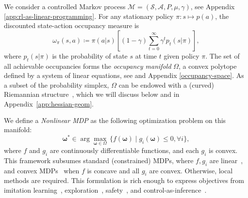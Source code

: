 \documentclass{article}
\theoremstyle{plain}
\theoremstyle{definition}
\theoremstyle{remark}
\newcommand{\sS}{\mathcal{S}}
\newcommand{\sA}{\mathcal{A}}
\begin{document}
We consider a controlled Markov process $\mathcal{M}=(\sS,\sA,P,\mu,\gamma)$, see Appendix \ref{app:rl-as-linear-programming}. 
For any stationary policy $\pi: s \mapsto p(a)$, the discounted state-action occupancy measure is
\begin{equation}
\omega_\pi(s,a) \coloneqq \pi(a|s)\left[(1-\gamma)\sum_{t=0}^\infty \gamma^t p_{t}(s|\pi)\right],
\end{equation}
where $p_{t}(s|\pi)$ is the probability of state $s$ at time $t$ given policy $\pi$. 
The set of all achievable occupancies forms the \emph{occupancy manifold} $\Omega$, a convex polytope defined by a system of linear equations, see \citep{kallenberg1994survey} and Appendix \ref{occupancy-space}. 
As a subset of the probability simplex, $\Omega$ can be endowed with a (curved) Riemannian structure~\citep{amari1982differential,ay2017information}, which we will discuss below and in Appendix~\ref{app:hessian-geom}.

We define a \emph{Nonlinear MDP} as the following optimization problem on this manifold:
\begin{equation}\label{eq:n-mdp}\tag{N-MDP}
\boldsymbol{\omega^*} \in \arg \max_{\boldsymbol{\omega} \in \Omega}\, \{f(\boldsymbol{\omega}) \mid g_i(\boldsymbol{\omega}) \leq 0, \forall i \},
\end{equation}
where $f$ and $g_i$ are continuously differentiable functions, and each $g_i$ is convex. This framework subsumes standard (constrained) MDPs, where $f, g_i$ are linear~\citep{Altman1999ConstrainedMD}, and convex MDPs~\citep{zahavy2021reward} when $f$ is concave and all $g_i$ are convex. 
Otherwise, local methods are required. This formulation is rich enough to express objectives from imitation learning~\citep{ho2016generative}, exploration~\citep{hazan2019provably}, safety~\citep{achiam2017constrained}, and control-as-inference~\citep{toussaint2006probabilistic, ziebart2008maximum,rawlik2012stochastic}.
\end{document}
